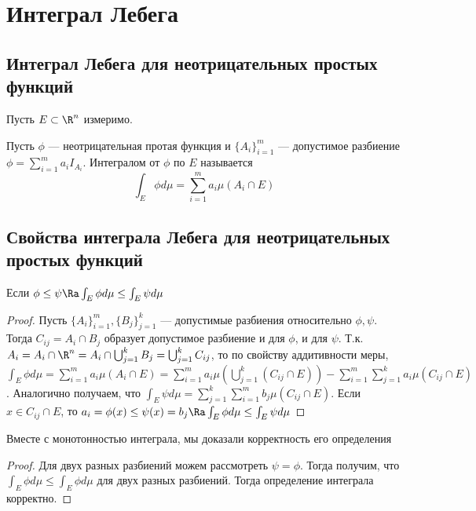 
\section{Интеграл Лебега}
\subsection{Интеграл Лебега для неотрицательных простых функций}
Пусть \(E \subset \R^n\) измеримо.
\begin{definition}
    Пусть \(\phi\) --- неотрицательная протая функция и \(\{A_i\}_{i = 1}^m\) --- допустимое разбиение \(\phi = \sum_{i = 1}^m a_iI_{A_i}\). Интегралом от \(\phi\) по \(E\) называется 
    \[\int_{E} \phi d\mu = \sum_{i = 1}^m a_i \mu(A_i \cap E)\]
\end{definition}


\subsection{Свойства интеграла Лебега для неотрицательных простых функций}
\begin{proposition}[Монотонность]
    Если \(\phi \le \psi \Ra \int_{E} \phi d \mu \le \int_{E} \psi d\mu\)
\end{proposition}
\begin{proof}
    Пусть \(\{A_i\}_{i = 1}^m, \{B_j\}_{j = 1}^k\) --- допустимые разбиения относительно \(\phi, \psi\). Тогда \(C_{ij} = A_i \cap B_j\) образует допустимое разбиение и для \(\phi\), и для \(\psi\). Т.к. \(A_i = A_i \cap \R^n = A_i \cap \bigcup_{j = 1}^k B_j = \bigcup_{j = 1}^k C_{ij}\), то по свойству аддитивности меры, \(\int_E \phi d\mu = \sum_{i = 1}^m a_i \mu(A_i \cap E) = \sum_{i = 1}^m a_i \mu\left(\bigcup_{j = 1}^k (C_{ij} \cap E)\right) - \sum_{i = 1}^m \sum_{j = 1}^k a_i \mu(C_{ij} \cap E)\). Аналогично получаем, что \(\int_E \psi d \mu = \sum_{j = 1}^k \sum_{i = 1}^m b_j \mu(C_{ij} \cap E)\). Если \(x \in C_{ij} \cap E\), то \(a_i = \phi(x) \le \psi(x) = b_j \Ra \int_E \phi d \mu \le \int_E \psi d \mu\)
\end{proof}

\begin{note}
    Вместе с монотонностью интеграла, мы доказали корректность его определения
\end{note}
\begin{proof}
    Для двух разных разбиений можем рассмотреть \(\psi = \phi\). Тогда получим, что \(\int_E \phi d \mu \le \int_E \phi d \mu\) для двух разных разбиений. Тогда определение интеграла корректно.
\end{proof}

